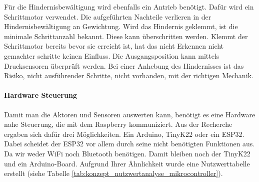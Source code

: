     Für die Hindernisbewältigung wird ebenfalls ein Antrieb benötigt. Dafür wird ein Schrittmotor verwendet. Die aufgeführten Nachteile verlieren in der Hindernisbewältigung an Gewichtung. Wird das Hindernis geklemmt, ist die minimale Schrittanzahl bekannt. Diese kann überschritten werden. Klemmt der Schrittmotor bereits bevor sie erreicht ist, hat das nicht Erkennen nicht gemachter schritte keinen Einfluss. Die Ausgangsposition kann mittels Drucksensoren überprüft werden. Bei einer Anhebung des Hindernisses ist das Risiko, nicht ausführender Schritte, nicht vorhanden, mit der richtigen Mechanik.

    \paragraph{Hardware Steuerung}
    Damit man die Aktoren und Sensoren auswerten kann, benötigt es eine Hardware nahe Steuerung, die mit dem Raspberry kommuniziert. Aus der Recherche ergaben sich dafür drei Möglichkeiten. Ein Arduino, TinyK22 oder ein ESP32. Dabei scheidet der ESP32 vor allem durch seine nicht benötigten Funktionen aus. Da wir weder WiFi noch Bluetooth benötigen. Damit bleiben noch der TinyK22 und ein Arduino-Board. Aufgrund Ihrer Ähnlichkeit wurde eine Nutzwerttabelle erstellt (siehe Tabelle \ref{tab:konzept_nutzwertanalyse_mikrocontroller}).
        
